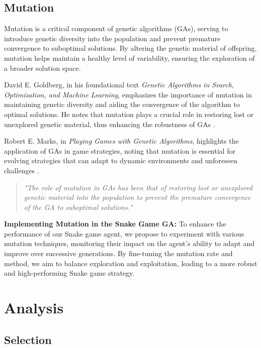 \documentclass[a4paper, twocolumn]{article}
\begin{document}
\subsection{Mutation\label{sec:Mutation}}

Mutation is a critical component of genetic algorithms (GAs), serving to introduce genetic diversity into the population and prevent premature convergence to suboptimal solutions. By altering the genetic material of offspring, mutation helps maintain a healthy level of variability, ensuring the exploration of a broader solution space.

David E. Goldberg, in his foundational text \textit{Genetic Algorithms in Search, Optimization, and Machine Learning}, emphasizes the importance of mutation in maintaining genetic diversity and aiding the convergence of the algorithm to optimal solutions. He notes that mutation plays a crucial role in restoring lost or unexplored genetic material, thus enhancing the robustness of GAs \cite{goldberg1989genetic}.

Robert E. Marks, in \textit{Playing Games with Genetic Algorithms}, highlights the application of GAs in game strategies, noting that mutation is essential for evolving strategies that can adapt to dynamic environments and unforeseen challenges \cite{marks2001playing}.

\begin{quote}
\emph{"The role of mutation in GAs has been that of restoring lost or unexplored genetic material into the population to prevent the premature convergence of the GA to suboptimal solutions."} \cite{srinvas1994adaptive}
\end{quote}

\textbf{Implementing Mutation in the Snake Game GA:} To enhance the performance of our Snake game agent, we propose to experiment with various mutation techniques, monitoring their impact on the agent's ability to adapt and improve over successive generations. By fine-tuning the mutation rate and method, we aim to balance exploration and exploitation, leading to a more robust and high-performing Snake game strategy.




\section{Analysis\label{sec:Analysis}}
\subsection{Selection\label{sec:Selection}}
\end{document}
